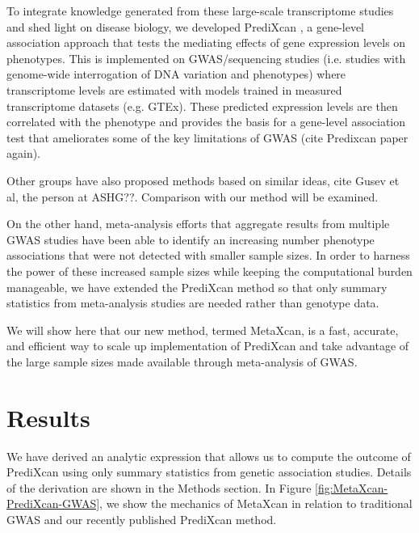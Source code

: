 \documentclass[10pt]{article}
\begin{document}
To integrate knowledge generated from these large-scale transcriptome studies and shed light on disease biology, we developed PrediXcan \cite{predixcan}, a gene-level association approach that tests the mediating effects of gene expression levels on phenotypes. This is implemented on GWAS/sequencing studies (i.e. studies with genome-wide interrogation of DNA variation and phenotypes) where transcriptome levels are estimated with models trained in measured transcriptome datasets (e.g. GTEx). These predicted expression levels are then correlated with the phenotype and provides the basis for a gene-level association test that ameliorates some of the key limitations of GWAS (cite Predixcan paper again). 

Other groups have also proposed methods based on similar ideas, cite Gusev et al, the person at ASHG??. Comparison with our method will be examined.

On the other hand, meta-analysis efforts that aggregate results from multiple GWAS studies have been able to identify an increasing number phenotype associations that were not detected with smaller sample sizes. In order to harness the power of these increased sample sizes while keeping the computational burden manageable, we have extended the PrediXcan method so that only summary statistics from meta-analysis studies are needed rather than genotype data. 

We will show here that our new method, termed MetaXcan, is a fast, accurate, and efficient way to scale up implementation of PrediXcan and take advantage of the large sample sizes made available through meta-analysis of GWAS.\\

\section*{Results}

We have derived an analytic expression that allows us to compute the outcome of PrediXcan using only summary statistics from genetic association studies. Details of the derivation are shown in the Methods section. 
In Figure \ref{fig:MetaXcan-PrediXcan-GWAS}, we show the mechanics of MetaXcan in relation to traditional GWAS and our recently published PrediXcan method. 
\end{document}
